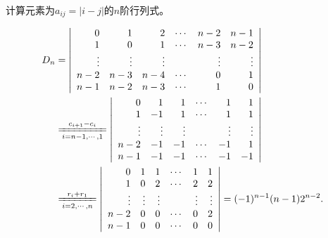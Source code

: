 \documentclass[10pt,a4paper%
tablecaptionabove]{article}
\newcommand{\cd}{\cdots}
\newcommand{\vd}{\vdots}
\begin{document}
\begin{CJK}{UTF8}{gkai}
\begin{jie}
  \end{jie}


  \begin{li}
    计算元素为$a_{ij}=|i-j|$的$n$阶行列式。
  \end{li}
  \begin{jie}
    $$
    \begin{aligned}
      D_{n} &  =   \left|
        \begin{array}{rrrrrrr}
          0   & 1   & 2    & \cd & n-2  & n-1 \\ 
          1   & 0   & 1    & \cd & n-3  & n-2 \\
          \vd & \vd & \vd  &     & \vd  & \vd \\
          n-2 & n-3 & n-4  & \cd & 0     & 1 \\
          n-1 & n-2 & n-3  & \cd & 1  & 0 
        \end{array}
      \right| \\
      &   \xlongequal[i=n-1,\cd,1]{c_{i+1}-c_i}   
      \left|
        \begin{array}{rrrrrrr}
          0   & 1   & 1    & \cd & 1  & 1 \\ 
          1   & -1  & 1    & \cd & 1  & 1 \\
          \vd & \vd & \vd  &     & \vd & \vd \\
          n-2 & -1  & -1   & \cd & -1 & 1 \\
          n-1 & -1  & -1   & \cd & -1 & -1 
        \end{array}
      \right| \\
      & \xlongequal[i=2,\cd,n]{r_{i}+r_1}  
      \left|
        \begin{array}{rrrrrrr}
          0   & 1   & 1   & \cd & 1   & 1   \\ 
          1   & 0   & 2   & \cd & 2   & 2   \\
          \vd & \vd & \vd &     & \vd & \vd \\
          n-2 & 0   & 0  & \cd  & 0   & 2 \\
          n-1 & 0   & 0  & \cd  & 0   & 0 
        \end{array}
      \right| = (-1)^{n-1}(n-1)2^{n-2}.
    \end{aligned}
    $$
  \end{jie}



\end{CJK}
\end{document}
